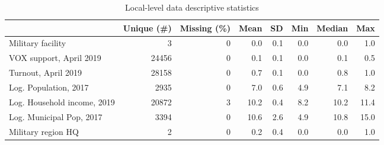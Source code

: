 \begin{table}[!h]

\caption{Local-level data descriptive statistics\label{tab:local\_desc}}
\centering
\begin{tabular}[t]{lrrrrrrr}
\toprule
  & Unique (\#) & Missing (\%) & Mean & SD & Min & Median & Max\\
\midrule
Military facility & 3 & 0 & 0.0 & 0.1 & 0.0 & 0.0 & 1.0\\
VOX support, April 2019 & 24456 & 0 & 0.1 & 0.1 & 0.0 & 0.1 & 0.5\\
Turnout, April 2019 & 28158 & 0 & 0.7 & 0.1 & 0.0 & 0.8 & 1.0\\
Log. Population, 2017 & 2935 & 0 & 7.0 & 0.6 & 4.9 & 7.1 & 8.2\\
Log. Household income, 2019 & 20872 & 3 & 10.2 & 0.4 & 8.2 & 10.2 & 11.4\\
Log. Municipal Pop, 2017 & 3394 & 0 & 10.6 & 2.6 & 4.9 & 10.8 & 15.0\\
Military region HQ & 2 & 0 & 0.2 & 0.4 & 0.0 & 0.0 & 1.0\\
\bottomrule
\end{tabular}
\end{table}
